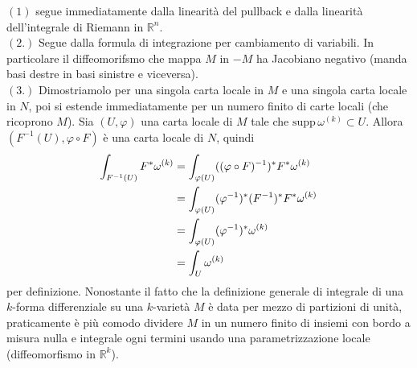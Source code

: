 \documentclass[twoside, 11pt]{amsbook}
\makeatletter
\newcommand{\0}{{(0)}}
\newcommand{\3}{{(3)}}
\theoremstyle{colonplain}
\theoremstyle{colondefinition}
\theoremstyle{colonremark}
\numberwithin{equation}{chapter}
\renewcommand{\proofname}{Dimostrazione}
\renewenvironment{proof}[1][\proofname]{\par
  \pushQED{\qed}%
  \normalfont \topsep6\p@\@plus6\p@\relax
  \trivlist
  \item[\hskip\labelsep\bfseries #1:]\ignorespaces
}{%
  \popQED\endtrivlist\@endpefalse
}
\makeatother
\begin{document}
\begin{proof} $(1)$ segue immediatamente dalla linearità del pullback e dalla linearità dell'integrale di Riemann in $\mathbb{R}^n$. \\
$(2.)$ Segue dalla formula di integrazione per cambiamento di variabili. In particolare il diffeomorifsmo che mappa $M$ in $-M$ ha Jacobiano negativo (manda basi destre in basi sinistre e viceversa). \\
$(3.)$ Dimostriamolo per una singola carta locale in $M$ e una singola carta locale in $N$, poi si estende immediatamente per un numero finito di carte locali (che ricoprono $M$). Sia $(U, \varphi)$ una carta locale di $M$ tale che $\mathrm{supp} \, \omega^{(k)} \subset U$. Allora $(F^{-1}(U), \varphi \circ F)$ è una carta locale di $N$, quindi
\begin{align}
    \int_{F^{-1}(U)} F^*\omega^{(k)} &= \int_{\varphi(U)} ((\varphi \circ F)^{-1})^*F^*\omega^{(k)} \notag \\
    &= \int_{\varphi(U)} (\varphi^{-1})^*(F^{-1})^*F^*\omega^{(k)} \notag \\
    &= \int_{\varphi(U)} (\varphi^{-1})^*\omega^{(k)} \notag \\
    &= \int_U \omega^{(k)}
\end{align}
per definizione.
\end{proof}
Nonostante il fatto che la definizione generale di integrale di una $k$-forma differenziale su una $k$-varietà $M$ è data per mezzo di partizioni di unità, praticamente è più comodo dividere $M$ in un numero finito di insiemi con bordo a misura nulla e integrale ogni termini usando una parametrizzazione locale (diffeomorfismo in $\mathbb{R}^k$).
\end{document}
